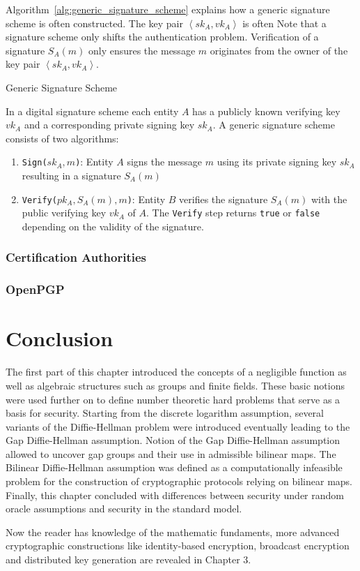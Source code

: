 Algorithm~\ref{alg:generic_signature_scheme} explains how a generic signature scheme is often constructed. The key pair $\left< sk_A, vk_A \right>$ is often  Note that a signature scheme only shifts the authentication problem. Verification of a signature $S_A \left( m \right)$ only ensures the message $m$ originates from the owner of the key pair $\left< sk_A, vk_A \right>$.
\begin{algorithm}
\caption{Generic Signature Scheme }
\label{alg:generic_signature_scheme}
 In a digital signature scheme each entity $A$ has a publicly known verifying key $vk_A$ and a corresponding private signing key $sk_A$. A generic signature scheme consists of two algorithms:
 \begin{enumerate}
  \item \texttt{Sign($sk_A, m$)}: Entity $A$ signs the message $m$ using its private signing key $sk_A$ resulting in a signature $S_A \left( m \right)$
  \item \texttt{Verify($pk_A, S_A \left( m \right), m$)}: Entity $B$ verifies the signature $S_A \left( m \right)$ with the public verifying key $vk_A$ of $A$. The \texttt{Verify} step returns \texttt{true} or \texttt{false} depending on the validity of the signature.
 \end{enumerate}
\end{algorithm}


\subsubsection{Certification Authorities} 

\subsubsection{OpenPGP}

\section{Conclusion}
The first part of this chapter introduced the concepts of a negligible function as well as algebraic structures such as groups and finite fields. These basic notions were used further on to define number theoretic hard problems that serve as a basis for security. Starting from the discrete logarithm assumption, several variants of the Diffie-Hellman problem were introduced eventually leading to the Gap Diffie-Hellman assumption. Notion of the Gap Diffie-Hellman assumption allowed to uncover gap groups and their use in admissible bilinear maps. The Bilinear Diffie-Hellman assumption was defined as a computationally infeasible problem for the construction of cryptographic protocols relying on bilinear maps. Finally, this chapter concluded with differences between security under random oracle assumptions and security in the standard model. 

Now the reader has knowledge of the mathematic fundaments, more advanced cryptographic constructions like identity-based encryption, broadcast encryption and distributed key generation are revealed in Chapter 3.

